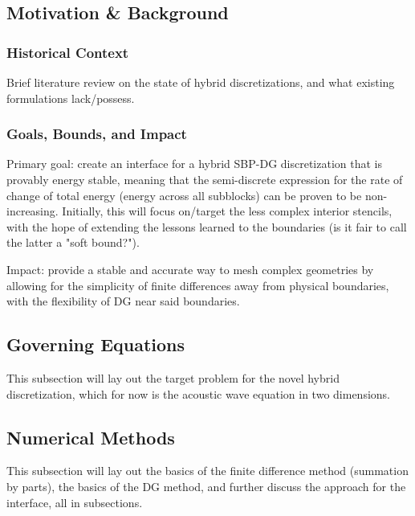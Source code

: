 \subsection{Motivation \& Background}

\subsubsection{Historical Context}

Brief literature review on the state of hybrid discretizations,
and what existing formulations lack/possess.

\subsubsection{Goals, Bounds, and Impact}

Primary goal: create an interface for a hybrid SBP-DG discretization
that is provably energy stable, meaning that the semi-discrete expression
for the rate of change of total energy (energy across all subblocks) can
be proven to be non-increasing. Initially, this will focus on/target the
less complex interior stencils, with the hope of extending the lessons
learned to the boundaries (is it fair to call the latter a "soft bound?").

Impact: provide a stable and accurate way to mesh complex geometries
by allowing for the simplicity of finite differences away from physical boundaries,
with the flexibility of DG near said boundaries.

\subsection{Governing Equations}

This subsection will lay out the target problem for the novel hybrid
discretization, which for now is the acoustic wave equation in two dimensions.

\subsection{Numerical Methods}

This subsection will lay out the basics of the finite difference method
(summation by parts), the basics of the DG method, and further discuss
the approach for the interface, all in subsections.

